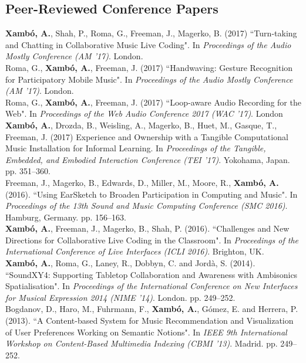 \documentclass[10pt, a4paper]{article}
\newcommand{\years}[1]{\marginnote{\scriptsize #1}}
\begin{document}
\subsection*{Peer-Reviewed Conference Papers}
\noindent
\years{2017d}\textbf{Xambó, A.}, Shah, P., Roma, G., Freeman, J., Magerko, B. (2017) “Turn-taking and Chatting in Collaborative Music Live Coding". In \emph{Proceedings of the Audio Mostly Conference (AM '17)}. London.\\ 
\years{2017c}Roma, G., \textbf{Xambó, A.}, Freeman, J. (2017) “Handwaving: Gesture Recognition for Participatory Mobile Music". In \emph{Proceedings of the Audio Mostly Conference (AM '17)}. London.\\
\years{2017b}Roma, G., \textbf{Xambó, A.}, Freeman, J. (2017) “Loop-aware Audio Recording for the Web". In \emph{Proceedings of the Web Audio Conference 2017 (WAC '17)}. London\\ 
\years{2017a}\textbf{Xambó, A.}, Drozda, B., Weisling, A., Magerko, B., Huet, M., Gasque, T., Freeman, J. (2017) Experience and Ownership with a Tangible Computational Music Installation for Informal Learning. In \emph{Proceedings of the Tangible, Embedded, and Embodied Interaction Conference (TEI '17)}. Yokohama, Japan. pp. 351--360.\\ 
\years{2016b}Freeman, J., Magerko, B., Edwards, D., Miller, M., Moore, R., \textbf{Xambó, A.} (2016). “Using EarSketch to Broaden Participation in Computing and Music". In \emph{Proceedings of the 13th Sound and Music Computing Conference (SMC 2016)}. Hamburg, Germany. pp. 156--163.\\
\years{2016a}\textbf{Xambó, A.}, Freeman, J., Magerko, B., Shah, P. (2016). “Challenges and New Directions for Collaborative Live Coding in the Classroom". In \emph{Proceedings of the International Conference of Live Interfaces (ICLI 2016)}. Brighton, UK.\\
\years{2014}\textbf{Xambó, A.}, Roma, G., Laney, R., Dobbyn, C. and Jordà, S. (2014). “SoundXY4: Supporting Tabletop Collaboration and Awareness with Ambisonics Spatialisation". In \emph{Proceedings of the International Conference on New Interfaces for Musical Expression 2014 (NIME '14)}. London. pp. 249--252.\\
\years{2013}Bogdanov, D., Haro, M., Fuhrmann, F., \textbf{Xambó, A.}, Gómez, E. and Herrera, P. (2013). “A Content-based System for Music Recommendation and Visualization of User Preferences Working on Semantic Notions". In \emph{IEEE 9th International Workshop on Content-Based Multimedia Indexing (CBMI '13)}. Madrid. pp. 249--252.\\
\end{document}
